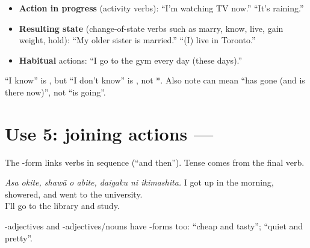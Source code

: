 \begin{itemize}
  \item \textbf{Action in progress} (activity verbs): 
        ``I'm watching TV now.''  ``It's raining.''
  \item \textbf{Resulting state} (change-of-state verbs such as 
        marry,  know,  live,  gain weight,  hold):
         ``My older sister is married.''
         ``(I) live in Toronto.''
  \item \textbf{Habitual} actions: 
        ``I go to the gym every day (these days).''
\end{itemize}

\begin{important}
``I know'' is , but ``I don't know'' is , not
*. Also note  can mean ``has gone (and is there
now)'', not ``is going''.
\end{important}

\section{Use 5: joining actions --- }
The -form links verbs in sequence (``and then''). Tense comes from the final verb.
\begin{example}
\emph{Asa okite, shawā o abite, daigaku ni ikimashita.}
I got up in the morning, showered, and went to the university.\\
 I'll go to the library and study.
\end{example}
-adjectives and -adjectives/nouns have -forms too:
 ``cheap and tasty'';  ``quiet and
pretty''.

